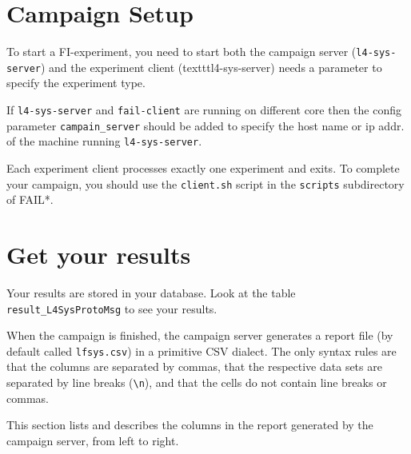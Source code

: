 \documentclass[a4paper,times,9pt]{article}
\begin{document}
\section{Campaign Setup}

To start a FI-experiment, you need to start both the campaign server 
(\verb+l4-sys-server+) and the experiment client (texttt{l4-sys-server})
needs a parameter to specify the experiment type.

If \verb+l4-sys-server+ and \verb+fail-client+ are running on 
different core then the config parameter \verb+campain_server+ should
be added to specify the host name or ip addr. of the machine running 
\verb+l4-sys-server+.

Each experiment client  processes exactly one experiment 
and exits. To complete your campaign, you should use the \verb+client.sh+
script in the \texttt{scripts} subdirectory of FAIL*.


\section{Get your results}

Your results are stored in your database. Look at the table \verb+result_L4SysProtoMsg+
to see your results. 

\iffalse
When the campaign is finished, the campaign server generates a report
file (by default called \texttt{lfsys.csv}) in a primitive CSV dialect.
The only syntax rules are that the columns are separated by commas,
that the respective data sets are separated by line breaks (\verb+\n+),
and that the cells do not contain line breaks or commas.

This section lists and describes the columns in the report generated by
the campaign server, from left to right.
\end{document}
